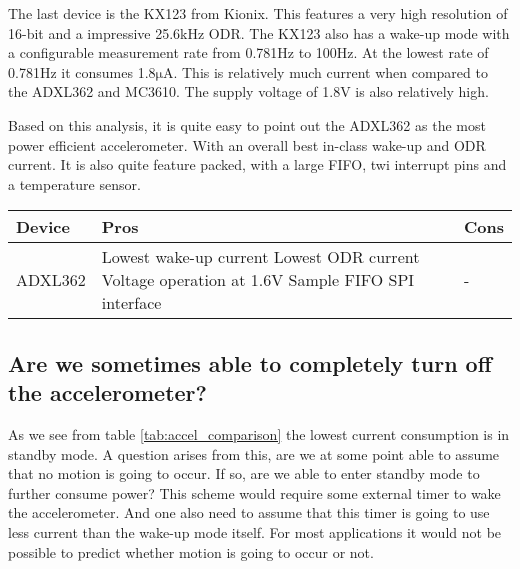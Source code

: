 The last device is the KX123 from Kionix. This features a very high resolution of 16-bit and a impressive 25.6kHz ODR. The KX123 also has a wake-up mode with a configurable measurement rate from 0.781Hz to 100Hz. At the lowest rate of 0.781Hz it consumes 1.8$\si{\micro\ampere}$. This is relatively much current when compared to the ADXL362 and MC3610. The supply voltage of 1.8V is also relatively high.

Based on this analysis, it is quite easy to point out the ADXL362 as the most power efficient accelerometer. With an overall best in-class wake-up and ODR current. It is also quite feature packed, with a large FIFO, twi interrupt pins and a temperature sensor.


\begin{center}
    \begin{tabular}{ | p{2cm} | p{5cm} | p{5cm} |}
    \hline
    Device & Pros & Cons \\ \hline
    ADXL362 & Lowest wake-up current \newline Lowest ODR current \newline Voltage operation at 1.6V \newline 512 Sample FIFO \newline SPI interface  & - \\ \hline
    \end{tabular}
\end{center}

\subsection{Are we sometimes able to completely turn off the accelerometer?}

As we see from table \ref{tab:accel_comparison} the lowest current consumption is in standby mode. A question arises from this, are we at some point able to assume that no motion is going to occur. If so, are we able to enter standby mode to further consume power? This scheme would require some external timer to wake the accelerometer. And one also need to assume that this timer is going to use less current than the wake-up mode itself. For most applications it would not be possible to predict whether motion is going to occur or not.
